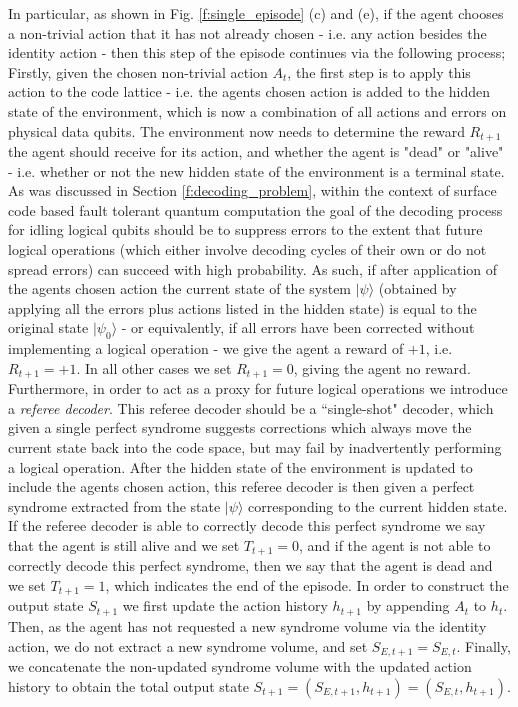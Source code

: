 \documentclass[twocolumn,preprintnumbers,amsmath,amssymb,notitlepage,nofootinbib,longbibliography,superscriptaddress,aps,pra,10pt]{revtex4-1}
\begin{document}
    In particular, as shown in Fig. \ref{f:single_episode} (c) and (e), if the agent chooses a non-trivial action that it has not already chosen - i.e. any action besides the identity action - then this step of the episode continues via the following process; 
    Firstly, given the chosen non-trivial action $A_t$, the first step is to apply this action to the code lattice - i.e. the agents chosen action is added to the hidden state of the environment, which is now a combination of all actions and errors on physical data qubits.
    The environment now needs to determine the reward $R_{t+1}$ the agent should receive for its action, and whether the agent is "dead" or "alive" - i.e. whether or not the new hidden state of the environment is a terminal state.
    As was discussed in Section \ref{f:decoding_problem}, within the context of surface code based fault tolerant quantum computation the goal of the decoding process for idling logical qubits should be to suppress errors to the extent that future logical operations (which either involve decoding cycles of their own or do not spread errors) can succeed with high probability.
    As such, if after application of the agents chosen action the current state of the system $|\psi\rangle$ (obtained by applying all the errors plus actions listed in the hidden state) is equal to the original state $|\psi_0\rangle$ - or equivalently, if all errors have been corrected without implementing a logical operation - we give the agent a reward of $+1$, i.e. $R_{t+1} = +1$.
    In all other cases we set $R_{t+1} = 0$, giving the agent no reward.
    Furthermore, in order to act as a proxy for future logical operations we introduce a \textit{referee decoder}.
    This referee decoder should be a ``single-shot" decoder, which given a single perfect syndrome suggests corrections which always move the current state back into the code space, but may fail by inadvertently performing a logical operation.
    After the hidden state of the environment is updated to include the agents chosen action, this referee decoder is then given a perfect syndrome extracted from the state $|\psi\rangle$ corresponding to the current hidden state.
    If the referee decoder is able to correctly decode this perfect syndrome we say that the agent is still alive and we set $T_{t+1} = 0$, and if the agent is not able to correctly decode this perfect syndrome, then we say that the agent is dead and we set $T_{t+1}=1$, which indicates the end of the episode.
    In order to construct the output state $S_{t+1}$ we first update the action history $h_{t+1}$ by appending $A_t$ to $h_t$.
    Then, as the agent has not requested a new syndrome volume via the identity action, we do not extract a new syndrome volume, and set $S_{E,{t+1}} = S_{E,t}$.
    Finally, we concatenate the non-updated syndrome volume with the updated action history to obtain the total output state $S_{t+1} = (S_{E,t+1},h_{t+1}) = (S_{E,t},h_{t+1})$.
\end{document}
